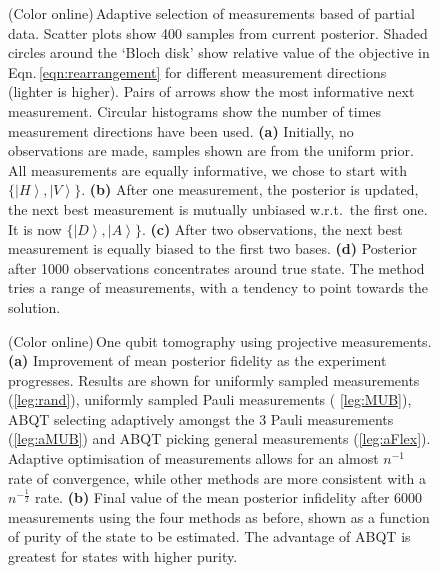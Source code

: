 \begin{figure}

\caption{(Color online)\,Adaptive selection of measurements based of partial data. Scatter plots show 400 samples from current posterior. Shaded circles around the `Bloch disk' show relative value of the objective in Eqn.\,\eqref{eqn:rearrangement} for different measurement directions (lighter is higher). Pairs of arrows show the most informative next measurement. Circular histograms show the number of times measurement directions have been used. \textbf{(a)}  Initially, no observations are made, samples shown are from the uniform prior. All measurements are equally informative, we chose to start with $\{\left\vert H\right\rangle,\left\vert V\right\rangle\}$. \textbf{(b)}  After one measurement, the posterior is updated, the next best measurement is mutually unbiased w.r.t.\ the first one. It is now $\{\left\vert D\right\rangle,\left\vert A\right\rangle\}$. \textbf{(c)} After two observations, the next best measurement is equally biased to the first two bases. \textbf{(d)} Posterior after 1000 observations concentrates around true state. The method tries a range of measurements, with a tendency to point towards the solution.
\label{fig:Bloch disk}}
\end{figure}

\begin{figure}
\figtwo
\caption{(Color online)\,One qubit tomography using projective measurements. \textbf{(a)}  Improvement of mean posterior fidelity as the experiment progresses. Results are shown for uniformly sampled measurements (\ref{leg:rand}), uniformly sampled Pauli measurements ( \ref{leg:MUB}), ABQT selecting adaptively amongst the 3 Pauli measurements (\ref{leg:aMUB}) and ABQT picking general measurements (\ref{leg:aFlex}). Adaptive optimisation of measurements allows for an almost $n^{-1}$ rate of convergence, while other methods are more consistent with a $n^{-\frac{1}{2}}$ rate. \textbf{(b)}  Final value of the mean posterior infidelity after 6000 measurements using the four methods as before, shown as a function of purity of the state to be estimated. The advantage of ABQT is greatest for states with higher purity. \label{fig:qubit_results}}
\end{figure}

